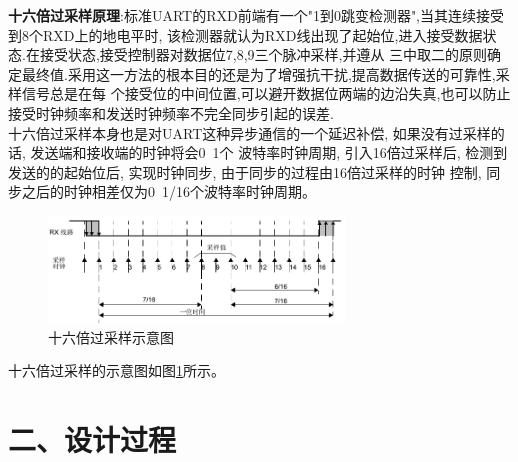 \documentclass{article}
\newcommand{\fourhao}{\fontsize{14pt}{\baselineskip}\selectfont} %
\newcommand{\xiaosihao}{\fontsize{12pt}{\baselineskip}\selectfont} %
\begin{document}
\textbf{十六倍过采样原理}:标准UART的RXD前端有一个"1到0跳变检测器",当其连续接受到8个RXD上的地电平时,
该检测器就认为RXD线出现了起始位,进入接受数据状态.在接受状态,接受控制器对数据位7,8,9三个脉冲采样,并遵从
三中取二的原则确定最终值.采用这一方法的根本目的还是为了增强抗干扰,提高数据传送的可靠性,采样信号总是在每
个接受位的中间位置,可以避开数据位两端的边沿失真,也可以防止接受时钟频率和发送时钟频率不完全同步引起的误差.\\

十六倍过采样本身也是对UART这种异步通信的一个延迟补偿, 如果没有过采样的话, 发送端和接收端的时钟将会0~1个
波特率时钟周期, 引入16倍过采样后, 检测到发送的的起始位后, 实现时钟同步, 由于同步的过程由16倍过采样的时钟
控制, 同步之后的时钟相差仅为0~1/16个波特率时钟周期。\\
\begin{figure}[htbp]
    \centering
    \includegraphics[width=0.7\textwidth]{image/2024-06-27-22-04-57.png}
    \caption{十六倍过采样示意图}
    \label{image_design_innovation_1}
\end{figure}
十六倍过采样的示意图如图\ref{image_design_innovation_1}所示。

\section*{\fourhao 二、设计过程}
\xiaosihao
{}
\end{document}

